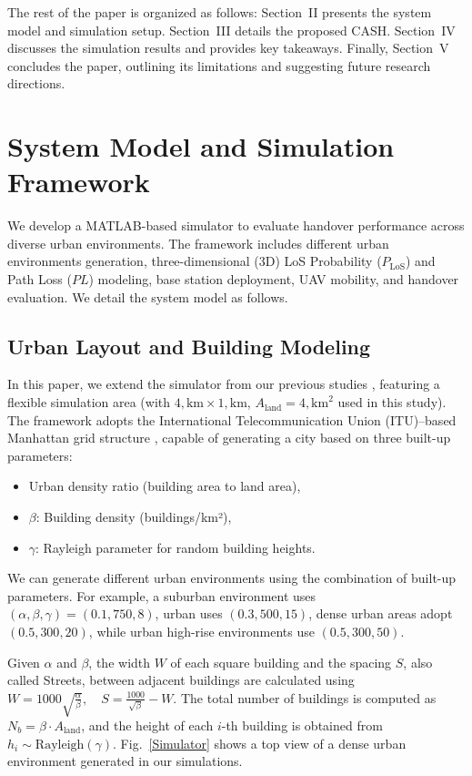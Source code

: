 \documentclass[conference]{IEEEtran}
\begin{document}
The rest of the paper is organized as follows: Section~II presents the system model and simulation setup. Section~III details the proposed CASH. Section~IV discusses the simulation results and provides key takeaways. Finally, Section~V concludes the paper, outlining its limitations and suggesting future research directions.


\section{System Model and Simulation Framework}
We develop a MATLAB-based simulator to evaluate handover performance across diverse urban environments. The framework includes different urban environments generation, three-dimensional (3D) LoS Probability ($P_{\mathrm{LoS}}$) and  Path Loss ($PL$) modeling, base station deployment, UAV mobility, and handover evaluation. We detail the system model as follows. 

\subsection{Urban Layout and Building Modeling}
In this paper, we extend the simulator from our previous studies \cite{saboorEUCAP, saboorWCNC}, featuring a flexible simulation area (with $4,\text{km} \times 1,\text{km}$, $A_{\text{land}} = 4,\text{km}^2$ used in this study). The framework adopts the International Telecommunication Union (ITU)--based Manhattan grid structure \cite{ITU}, capable of generating a city based on three built-up parameters:



\begin{itemize}
    \item Urban density ratio (building area to land area),
    \item \(\beta\): Building density (buildings/km²),
    \item \(\gamma\): Rayleigh parameter for random building heights.
\end{itemize}

We can generate different urban environments using the combination of built-up parameters. For example, a suburban environment uses $(\alpha, \beta, \gamma) = (0.1, 750, 8)$, urban uses $(0.3, 500, 15)$, dense urban areas adopt $(0.5, 300, 20)$, while urban high-rise environments use $(0.5, 300, 50)$.

Given $\alpha$ and $\beta$, the width $W$ of each square building and the spacing $S$, also called Streets, between adjacent buildings are calculated using $W = 1000 \sqrt{\frac{\alpha}{\beta}}, \quad S = \frac{1000}{\sqrt{\beta}} - W$. The total number of buildings is computed as $N_b = \beta \cdot A_{\text{land}}$, and the height of each $i$-th building is obtained from $h_i \sim \text{Rayleigh}(\gamma)$. Fig.~\ref{Simulator} shows a top view of a dense urban environment generated in our simulations.
\end{document}
